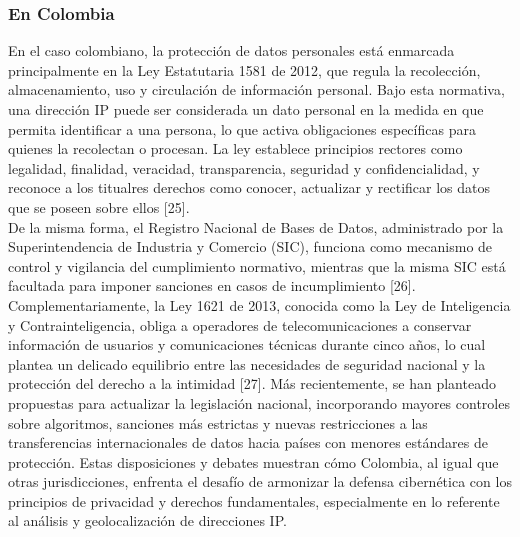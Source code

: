 \subsubsection{En Colombia}
En el caso colombiano, la protección de datos personales está enmarcada principalmente en la Ley Estatutaria 1581 de 2012, que regula la recolección, almacenamiento, uso y circulación de información personal. Bajo esta normativa, una dirección IP puede ser considerada un dato personal en la medida en que permita identificar a una persona, lo que activa obligaciones específicas para quienes la recolectan o procesan. La ley establece principios rectores como legalidad, finalidad, veracidad, transparencia, seguridad y confidencialidad, y reconoce a los titualres derechos como conocer, actualizar y rectificar los datos que se poseen sobre ellos [25]. \\
De la misma forma, el Registro Nacional de Bases de Datos, administrado por la Superintendencia de Industria y Comercio (SIC), funciona como mecanismo de control y vigilancia del cumplimiento normativo, mientras que la misma SIC está facultada para imponer sanciones en casos de incumplimiento [26]. Complementariamente, la Ley 1621 de 2013, conocida como la Ley de Inteligencia y Contrainteligencia, obliga a operadores de telecomunicaciones a conservar información de usuarios y comunicaciones técnicas durante cinco años, lo cual plantea un delicado equilibrio entre las necesidades de seguridad nacional y la protección del derecho a la intimidad [27]. Más recientemente, se han planteado propuestas para actualizar la legislación nacional, incorporando mayores controles sobre algoritmos, sanciones más estrictas y nuevas restricciones a las transferencias internacionales de datos hacia países con menores estándares de protección. Estas disposiciones y debates muestran cómo Colombia, al igual que otras jurisdicciones, enfrenta el desafío de armonizar la defensa cibernética con los principios de privacidad y derechos fundamentales, especialmente en lo referente al análisis y geolocalización de direcciones IP.

